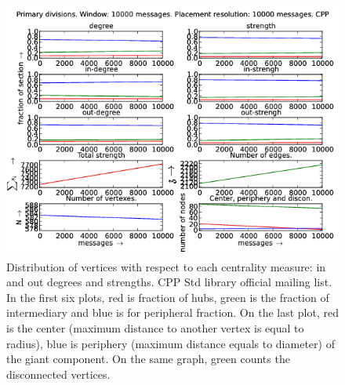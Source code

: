 \documentclass[%
 aip,
 jmp,%
 amsmath,amssymb,
 reprint,%
]{revtex4-1}
\begin{document}
\begin{figure}[hb]
   \centering
        \includegraphics[width=\textwidth]{figs/CPP/10000}
    \caption{Distribution of vertices with respect to each centrality measure: in and out degrees and strengths. CPP Std library official mailing list. In the first six plots, red is fraction of hubs, green is the fraction of intermediary and blue is for peripheral fraction. On the last plot, red is the center (maximum distance to another vertex is equal to radius), blue is periphery (maximum distance equals to diameter) of the giant component. On the same graph, green counts the disconnected vertices.}
    \label{fig:cpp10000}
\end{figure}
\end{document}
